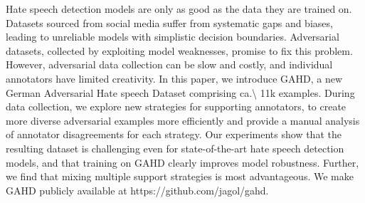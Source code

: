 Hate speech detection models are only as good as the data they are trained on. Datasets sourced from social media suffer from systematic gaps and biases, leading to unreliable models with simplistic decision boundaries. Adversarial datasets, collected by exploiting model weaknesses, promise to fix this problem. However, adversarial data collection can be slow and costly, and individual annotators have limited creativity. In this paper, we introduce GAHD, a new German Adversarial Hate speech Dataset comprising ca.\textbackslash{} 11k examples. During data collection, we explore new strategies for supporting annotators, to create more diverse adversarial examples more efficiently and provide a manual analysis of annotator disagreements for each strategy. Our experiments show that the resulting dataset is challenging even for state-of-the-art hate speech detection models, and that training on GAHD clearly improves model robustness. Further, we find that mixing multiple support strategies is most advantageous. We make GAHD publicly available at https://github.com/jagol/gahd.
